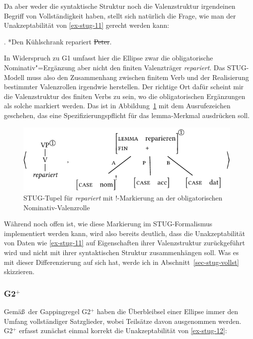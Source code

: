 Da aber weder die syntaktische Struktur noch die Valenzstruktur irgendeinen Begriff von Vollständigkeit haben, stellt sich natürlich die Frage, wie man der Unakzeptabilität von \ref{ex-stug-11} gerecht werden kann:

\ex. \label{ex-stug-11} *Den Kühlschrank repariert \sout{Peter}.

In Widerspruch zu G1 umfasst hier die Ellipse zwar die obligatorische Nominativ"=Ergänzung aber nicht den finiten Valenzträger {\it repariert}. Das STUG-Modell muss also den Zusammenhang zwischen finitem Verb und der Realisierung bestimmter Valenzrollen irgendwie herstellen. Der richtige Ort dafür scheint mir die Valenzstruktur des finiten Verbs zu sein, wo die obligatorischen Ergänzungen als solche markiert werden. Das ist in Abbildung~\ref{fig-stug-15} mit dem Ausrufezeichen geschehen, das eine Spezifizierungspflicht für das {\sc lemma}-Merkmal ausdrücken soll.
\begin{figure}[t]
\centering
\includegraphics{graphics/abb915.pdf}
\caption{\label{fig-stug-15}STUG-Tupel für {\it repariert} mit !-Markierung an der obligatorischen Nominativ-Valenzrolle}
\end{figure}
Während noch offen ist, wie diese Markierung im STUG-Formalismus implementiert werden kann, wird also bereits deutlich, dass die Unakzeptabilität von Daten wie \ref{ex-stug-11} auf Eigenschaften ihrer Valenzstruktur zurückgeführt wird und nicht mit ihrer syntaktischen Struktur zusammenhängen soll. Was es mit dieser Differenzierung auf sich hat, werde ich in Abschnitt~\ref{sec-stug-vollst} skizzieren. 

\subsubsection*{G2$^+$} \label{sec-stug-g2}

Gemä\ss\ der Gappingregel G2$^+$ haben die Überbleibsel einer Ellipse immer den Umfang vollständiger Satzglieder, wobei Teilsätze davon ausgenommen werden. G2$^+$ erfasst zunächst einmal korrekt die Unakzeptabilität von \ref{ex-stug-12}: 

